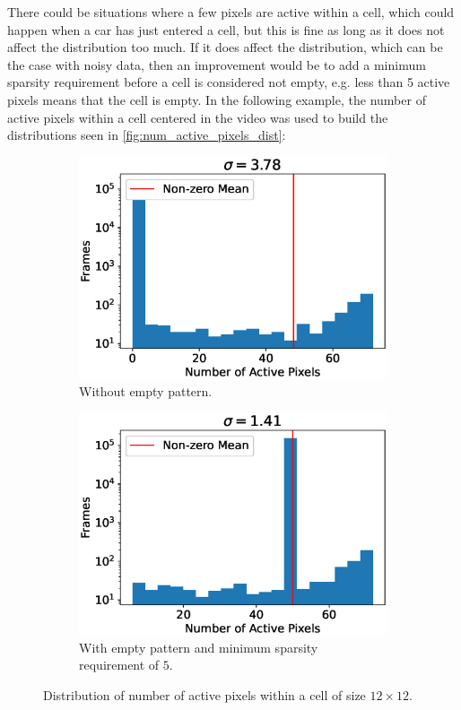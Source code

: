 There could be situations where a few pixels are active within a cell, which could happen when a car has just entered a cell, but this is fine as long as it does not affect the distribution too much. If it does affect the distribution, which can be the case with noisy data, then an improvement would be to add a minimum sparsity requirement before a cell is considered not empty, e.g. less than 5 active pixels means that the cell is empty.  In the following example, the number of active pixels within a cell centered in the video was used to build the distributions seen in \autoref{fig:num_active_pixels_dist}:
\begin{figure}[H]
    \centering
    \begin{subfigure}[t]{0.49\textwidth}
        \centering
        \includegraphics[width=\textwidth]{resources/methodology/active_pixels_dist.eps}
        \caption{Without empty pattern.}
    \end{subfigure}%
    \begin{subfigure}[t]{0.49\textwidth}
        \centering
        \includegraphics[width=\textwidth]{resources/methodology/active_pixels_dist2.eps}
        \caption{With empty pattern and minimum sparsity requirement of $5$.}
    \end{subfigure}
    \caption[Distribution of Active Pixels]{Distribution of number of active pixels within a cell of size $12\times 12$.}
    \label{fig:num_active_pixels_dist}
\end{figure}


